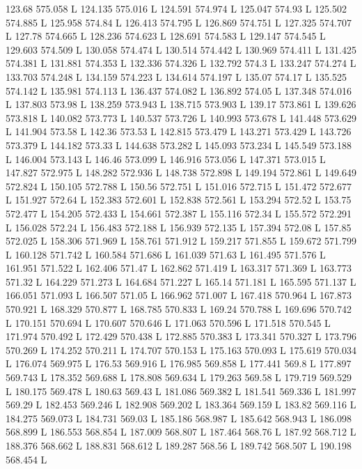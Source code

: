 123.68 575.058 L
124.135 575.016 L
124.591 574.974 L
125.047 574.93 L
125.502 574.885 L
125.958 574.84 L
126.413 574.795 L
126.869 574.751 L
127.325 574.707 L
127.78 574.665 L
128.236 574.623 L
128.691 574.583 L
129.147 574.545 L
129.603 574.509 L
130.058 574.474 L
130.514 574.442 L
130.969 574.411 L
131.425 574.381 L
131.881 574.353 L
132.336 574.326 L
132.792 574.3 L
133.247 574.274 L
133.703 574.248 L
134.159 574.223 L
134.614 574.197 L
135.07 574.17 L
135.525 574.142 L
135.981 574.113 L
136.437 574.082 L
136.892 574.05 L
137.348 574.016 L
137.803 573.98 L
138.259 573.943 L
138.715 573.903 L
139.17 573.861 L
139.626 573.818 L
140.082 573.773 L
140.537 573.726 L
140.993 573.678 L
141.448 573.629 L
141.904 573.58 L
142.36 573.53 L
142.815 573.479 L
143.271 573.429 L
143.726 573.379 L
144.182 573.33 L
144.638 573.282 L
145.093 573.234 L
145.549 573.188 L
146.004 573.143 L
146.46 573.099 L
146.916 573.056 L
147.371 573.015 L
147.827 572.975 L
148.282 572.936 L
148.738 572.898 L
149.194 572.861 L
149.649 572.824 L
150.105 572.788 L
150.56 572.751 L
151.016 572.715 L
151.472 572.677 L
151.927 572.64 L
152.383 572.601 L
152.838 572.561 L
153.294 572.52 L
153.75 572.477 L
154.205 572.433 L
154.661 572.387 L
155.116 572.34 L
155.572 572.291 L
156.028 572.24 L
156.483 572.188 L
156.939 572.135 L
157.394 572.08 L
157.85 572.025 L
158.306 571.969 L
158.761 571.912 L
159.217 571.855 L
159.672 571.799 L
160.128 571.742 L
160.584 571.686 L
161.039 571.63 L
161.495 571.576 L
161.951 571.522 L
162.406 571.47 L
162.862 571.419 L
163.317 571.369 L
163.773 571.32 L
164.229 571.273 L
164.684 571.227 L
165.14 571.181 L
165.595 571.137 L
166.051 571.093 L
166.507 571.05 L
166.962 571.007 L
167.418 570.964 L
167.873 570.921 L
168.329 570.877 L
168.785 570.833 L
169.24 570.788 L
169.696 570.742 L
170.151 570.694 L
170.607 570.646 L
171.063 570.596 L
171.518 570.545 L
171.974 570.492 L
172.429 570.438 L
172.885 570.383 L
173.341 570.327 L
173.796 570.269 L
174.252 570.211 L
174.707 570.153 L
175.163 570.093 L
175.619 570.034 L
176.074 569.975 L
176.53 569.916 L
176.985 569.858 L
177.441 569.8 L
177.897 569.743 L
178.352 569.688 L
178.808 569.634 L
179.263 569.58 L
179.719 569.529 L
180.175 569.478 L
180.63 569.43 L
181.086 569.382 L
181.541 569.336 L
181.997 569.29 L
182.453 569.246 L
182.908 569.202 L
183.364 569.159 L
183.82 569.116 L
184.275 569.073 L
184.731 569.03 L
185.186 568.987 L
185.642 568.943 L
186.098 568.899 L
186.553 568.854 L
187.009 568.807 L
187.464 568.76 L
187.92 568.712 L
188.376 568.662 L
188.831 568.612 L
189.287 568.56 L
189.742 568.507 L
190.198 568.454 L
